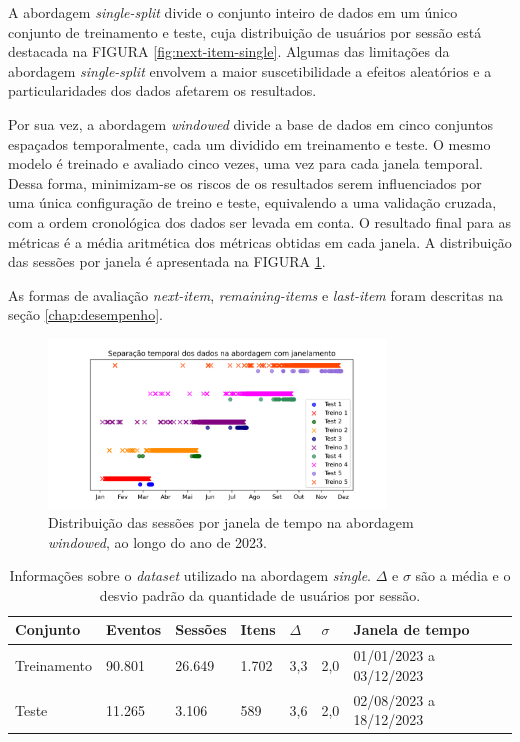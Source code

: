   A abordagem \textit{single-split} divide o conjunto inteiro de dados em um
  único conjunto de treinamento e teste, cuja distribuição de usuários por
  sessão está destacada na FIGURA \ref{fig:next-item-single}. Algumas das
  limitações da abordagem \textit{single-split} envolvem a maior suscetibilidade
  a efeitos aleatórios e a particularidades dos dados afetarem os resultados.
  
  Por sua vez, a abordagem \textit{windowed} divide a base de dados em cinco
  conjuntos espaçados temporalmente, cada um dividido em treinamento e teste. O
  mesmo modelo é treinado e avaliado cinco vezes, uma vez para cada janela temporal.
  Dessa forma, minimizam-se os riscos de os resultados serem influenciados por
  uma única configuração de treino e teste, equivalendo a uma validação cruzada,
  com a ordem cronológica dos dados ser levada em conta. O
  resultado final para as métricas é a média aritmética dos métricas obtidas em
  cada janela. A distribuição das sessões por janela é apresentada na FIGURA
  \ref{fig:scatter_plot}.

  As formas de avaliação \textit{next-item}, \textit{remaining-items} e
  \textit{last-item} foram descritas na seção \ref{chap:desempenho}.

\begin{figure}
  \centering
  \includegraphics[width=0.8\textwidth]{chapters/chap04/images/scatter_plot.png}
  \caption{Distribuição das sessões por janela de tempo na abordagem
  \textit{windowed}, ao longo do ano de 2023.}
  \label{fig:scatter_plot}
\end{figure}


  \begin{table}
    \centering
    \begin{tabular}{|l|l|l|l|l|l|l|}
      \hline
      Conjunto & Eventos & Sessões & Itens & $\Delta$ & $\sigma$ & Janela de tempo \\ \hline 
         Treinamento & 90.801 & 26.649 & 1.702 & 3,3 & 2,0 & 01/01/2023 a 03/12/2023 \\ \hline
        Teste & 11.265 & 3.106 & 589 & 3,6 & 2,0 & 02/08/2023 a 18/12/2023 \\ \hline
    \end{tabular}
    \caption{Informações sobre o \textit{dataset} utilizado na abordagem
    \textit{single}. $\Delta$ e $\sigma$ são a média e o desvio padrão da quantidade de
    usuários por sessão.}
    \label{tab:split_data}
  \end{table}

